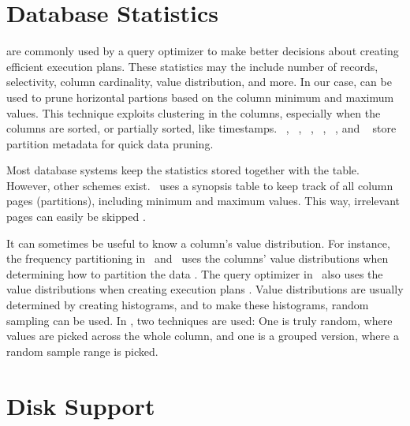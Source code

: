 \section{Database Statistics}
\label{sec:Database Statistics}
 are commonly used by a query optimizer to make better decisions about creating efficient execution plans. These statistics may the include number of records, selectivity, column cardinality, value distribution, and more. In our case,  can be used to prune horizontal partions based on the column minimum and maximum values. This technique exploits clustering in the columns, especially when the columns are sorted, or partially sorted, like timestamps. \oracle~\cite{Lahiri2015-mz}, \ibm~\cite{Raman2013-em}, \vertica~\cite{Lamb2012-kg}, \monetx~\cite{Boncz2005-wj}, \mssql~\cite{Larson2013-mc}, and \exasol~\cite{Exasol2014-xh} store partition metadata for quick data pruning.

Most database systems keep the statistics stored together with the table. However, other schemes exist. \ibm~uses a synopsis table to keep track of all column pages (partitions), including minimum and maximum values. This way, irrelevant pages can easily be skipped \cite{Raman2013-em}.

It can sometimes be useful to know a column's value distribution. For instance, the frequency partitioning in \blink~and \ibm~uses the columns' value distributions when determining how to partition the data \cite{Raman2008-gi, Raman2013-em}. The query optimizer in \mssql~also uses the value distributions when creating execution plans \cite{Larson2013-mc}. Value distributions are usually determined by creating histograms, and to make these histograms, random sampling can be used. In \mssql, two techniques are used: One is truly random, where values are picked across the whole column, and one is a grouped version, where a random sample range is picked.

\section{Disk Support}
\label{sec:Disk Support}


